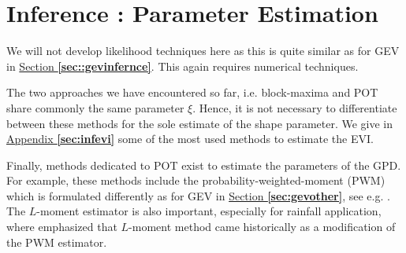 \section{Inference : Parameter Estimation}\label{sec::potinfernce} 

We will not develop likelihood techniques here as this is quite similar as for GEV in \hyperref[sec::gevinfernce]{Section \textbf{\ref{sec::gevinfernce}}}. This again requires numerical techniques. 


The two approaches we have encountered so far, i.e. block-maxima and POT share commonly the same parameter $\xi$. Hence, it is not necessary to differentiate between these methods for the sole estimate of the shape parameter. We give in \hyperref[sec:infevi]{Appendix \textbf{\ref{sec:infevi}}} some of the most used methods to estimate the EVI.

Finally, methods dedicated to POT exist to estimate the parameters of the GPD. For example, these methods include the probability-weighted-moment (PWM) which is formulated differently as for GEV in \hyperref[sec:gevother]{Section \textbf{\ref{sec:gevother}}}, see e.g. 
\citet{ribereau_skew_2016}. The $L$-moment estimator is also important, especially for rainfall application, where \cite{hosking_regional_1997} emphasized that $L$-moment method came historically as a modification of the PWM estimator.



